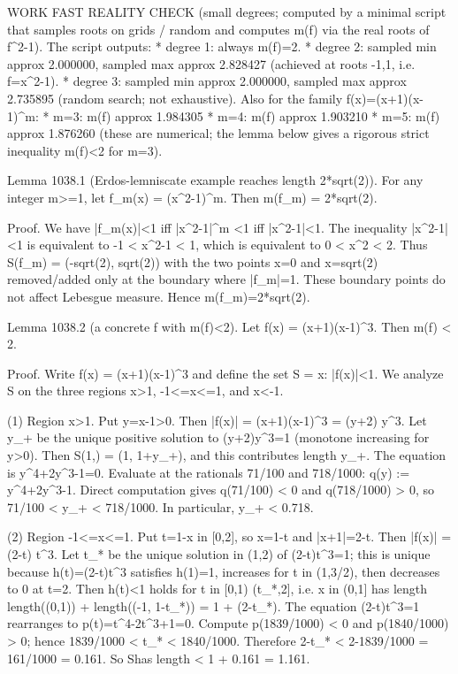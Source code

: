 WORK
FAST REALITY CHECK (small degrees; computed by a minimal script that samples roots on grids / random and computes m(f) via the real roots of f^2-1).
The script outputs:
* degree 1: always m(f)=2.
* degree 2: sampled min approx 2.000000, sampled max approx 2.828427 (achieved at roots -1,1, i.e. f=x^2-1).
* degree 3: sampled min approx 2.000000, sampled max approx 2.735895 (random search; not exhaustive).
Also for the family f(x)=(x+1)(x-1)^m:
* m=3: m(f) approx 1.984305
* m=4: m(f) approx 1.903210
* m=5: m(f) approx 1.876260
(these are numerical; the lemma below gives a rigorous strict inequality m(f)<2 for m=3).

Lemma 1038.1 (Erdos-lemniscate example reaches length 2*sqrt(2)).
For any integer m>=1, let f_m(x) = (x^2-1)^m. Then
  m(f_m) = 2*sqrt(2).

Proof.
We have |f_m(x)|<1 iff |x^2-1|^m <1 iff |x^2-1|<1. The inequality |x^2-1|<1 is equivalent to
  -1 < x^2-1 < 1,
which is equivalent to
  0 < x^2 < 2.
Thus S(f_m) = (-sqrt(2), sqrt(2)) with the two points x=0 and x=\pm sqrt(2) removed/added only at the boundary where |f_m|=1. These boundary points do not affect Lebesgue measure. Hence m(f_m)=2*sqrt(2).

Lemma 1038.2 (a concrete f with m(f)<2).
Let f(x) = (x+1)(x-1)^3. Then m(f) < 2.

Proof.
Write f(x) = (x+1)(x-1)^3 and define the set S = {x: |f(x)|<1}.
We analyze S on the three regions x>1, -1<=x<=1, and x<-1.

(1) Region x>1.  Put y=x-1>0. Then
  |f(x)| = (x+1)(x-1)^3 = (y+2) y^3.
Let y_+ be the unique positive solution to (y+2)y^3=1 (monotone increasing for y>0). Then S\cap(1,\infty) = (1, 1+y_+), and this contributes length y_+.
The equation is y^4+2y^3-1=0. Evaluate at the rationals 71/100 and 718/1000:
  q(y) := y^4+2y^3-1.
Direct computation gives q(71/100) < 0 and q(718/1000) > 0, so 71/100 < y_+ < 718/1000.
In particular, y_+ < 0.718.

(2) Region -1<=x<=1.  Put t=1-x in [0,2], so x=1-t and |x+1|=2-t. Then
  |f(x)| = (2-t) t^3.
Let t_* be the unique solution in (1,2) of (2-t)t^3=1; this is unique because h(t)=(2-t)t^3 satisfies h(1)=1, increases for t in (1,3/2), then decreases to 0 at t=2.
Then h(t)<1 holds for t in [0,1) \cup (t_*,2], i.e. x in (0,1] \cup [-1, 1-t_*).
So the contribution of S\cap[-1,1] has length
  length((0,1)) + length((-1, 1-t_*)) = 1 + (2-t_*).
The equation (2-t)t^3=1 rearranges to p(t)=t^4-2t^3+1=0. Compute p(1839/1000) < 0 and p(1840/1000) > 0; hence 1839/1000 < t_* < 1840/1000.
Therefore 2-t_* < 2-1839/1000 = 161/1000 = 0.161.
So S\cap[-1,1] has length < 1 + 0.161 = 1.161.

